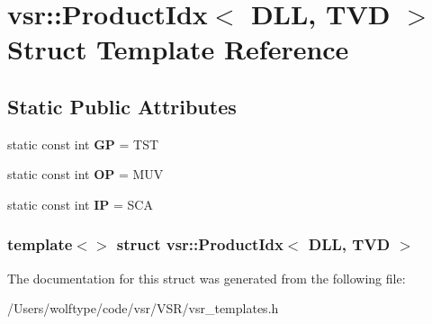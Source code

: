 \hypertarget{structvsr_1_1_product_idx_3_01_d_l_l_00_01_t_v_d_01_4}{\section{vsr\-:\-:Product\-Idx$<$ D\-L\-L, T\-V\-D $>$ Struct Template Reference}
\label{structvsr_1_1_product_idx_3_01_d_l_l_00_01_t_v_d_01_4}
}
\subsection*{Static Public Attributes}
\begin{DoxyCompactItemize}
\item 
\hypertarget{structvsr_1_1_product_idx_3_01_d_l_l_00_01_t_v_d_01_4_ad4a375e021d65f44907e57af187ccfcd}{static const int {\bfseries G\-P} = T\-S\-T}\label{structvsr_1_1_product_idx_3_01_d_l_l_00_01_t_v_d_01_4_ad4a375e021d65f44907e57af187ccfcd}

\item 
\hypertarget{structvsr_1_1_product_idx_3_01_d_l_l_00_01_t_v_d_01_4_ab63c4d744d3daead4d4afa23fc1540a0}{static const int {\bfseries O\-P} = M\-U\-V}\label{structvsr_1_1_product_idx_3_01_d_l_l_00_01_t_v_d_01_4_ab63c4d744d3daead4d4afa23fc1540a0}

\item 
\hypertarget{structvsr_1_1_product_idx_3_01_d_l_l_00_01_t_v_d_01_4_a5007959fb745e4163b979f81b9c0f113}{static const int {\bfseries I\-P} = S\-C\-A}\label{structvsr_1_1_product_idx_3_01_d_l_l_00_01_t_v_d_01_4_a5007959fb745e4163b979f81b9c0f113}

\end{DoxyCompactItemize}
\subsubsection*{template$<$$>$ struct vsr\-::\-Product\-Idx$<$ D\-L\-L, T\-V\-D $>$}



The documentation for this struct was generated from the following file\-:\begin{DoxyCompactItemize}
\item 
/\-Users/wolftype/code/vsr/\-V\-S\-R/vsr\-\_\-templates.\-h\end{DoxyCompactItemize}
